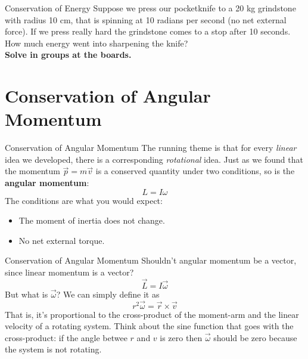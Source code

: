 \documentclass{beamer}
\begin{document}
\begin{frame}{Conservation of Energy}
Suppose we press our pocketknife to a 20 kg grindstone with radius 10 cm, that is spinning at 10 radians per second (no net external force).  If we press really hard the grindstone comes to a stop after 10 seconds.  How much energy went into sharpening the knife? \\ \vspace{1cm}
\textbf{Solve in groups at the boards.}
\end{frame}

\section{Conservation of Angular Momentum}

\begin{frame}{Conservation of Angular Momentum}
The running theme is that for every \textit{linear} idea we developed, there is a corresponding \textit{rotational} idea.  Just as we found that the momentum $\vec{p} = m\vec{v}$ is a conserved quantity under two conditions, so is the \textbf{angular momentum}:
\begin{equation}
L = I\omega
\end{equation}
The conditions are what you would expect:
\begin{itemize}
\item The moment of inertia does not change.
\item No net external torque.
\end{itemize}
\end{frame}

\begin{frame}{Conservation of Angular Momentum}
\small
Shouldn't angular momentum be a vector, since linear momentum is a vector?
\begin{equation}
\vec{L} = I\vec{\omega}
\end{equation}
But what is $\vec{\omega}$?  We can simply define it as
\begin{equation}
r^2 \vec{\omega} = \vec{r} \times \vec{v}
\end{equation}
That is, it's proportional to the cross-product of the moment-arm and the linear velocity of a rotating system.  Think about the sine function that goes with the cross-product: if the angle betwee $r$ and $v$ is zero then $\vec{\omega}$ should be zero because the system is not rotating.
\end{frame}
\end{document}
